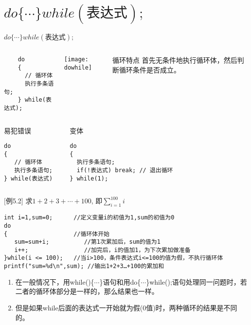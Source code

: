 \section{$do \{\cdots\} while(\text{表达式});$}

\begin{frame}{$do \{\cdots\} while(\text{表达式});$}
\vspace{-0.3cm}
\begin{columns}
	\begin{lstlisting} 
    do  
    {
      // 循环体
      执行多条语句;  
    } while(表达式);  
    \end{lstlisting}
	\texttt{[image: dowhile]}
	\begin{block}{循环特点}
		首先无条件地执行循环体，然后判断循环条件是否成立。
	\end{block}
\end{columns}
\vspace{-0.2cm}
\begin{columns}
\begin{block}{易犯错误}
\begin{lstlisting} 
do  
{
   // 循环体
   执行多条语句;  
} while(表达式)
\end{lstlisting}
\end{block}
\begin{block}{变体}
\begin{lstlisting} 
do  
{
  执行多条语句;  
  if(!表达式) break; // 退出循环  
} while(1);
\end{lstlisting}
\end{block}
\end{columns}
\end{frame}

\begin{frame}
$[$例5.2$]$ 求$1+2+3+\cdots+100$, 即$\sum\limits_{i=1}^{100}i$
\medskip
\begin{lstlisting}[frame=lines]
int i=1,sum=0;      //定义变量i的初值为1,sum的初值为0  
do     
{                   //循环体开始
   sum=sum+i;          //第1次累加后，sum的值为1
   i++;                //加完后，i的值加1，为下次累加做准备
}while(i <= 100);   //当i>100，条件表达式i<=100的值为假，不执行循环体
printf("sum=%d\n",sum); //输出1+2+3…+100的累加和                
\end{lstlisting}
\begin{enumerate}
	\setlength{\itemsep}{.2cm}
	\item 在一般情况下，用while()\{$\cdots$\}语句和用do\{$\cdots$\}while();语句处理同一问题时，若二者的循环体部分是一样的，那么结果也一样。
	\item 但是如果while后面的表达式一开始就为假(0值)时，两种循环的结果是不同的。
\end{enumerate}
\end{frame}

